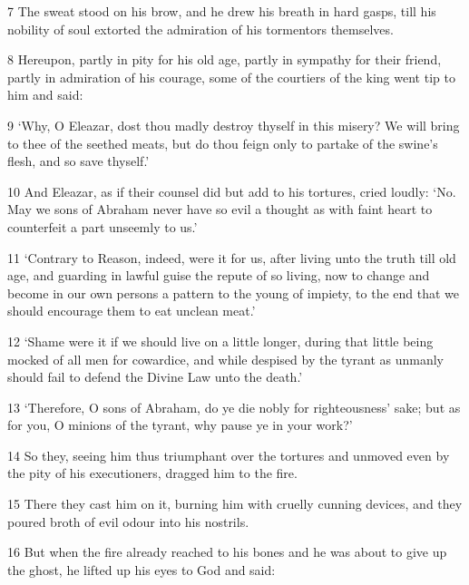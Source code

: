 \par 7 The sweat stood on his brow, and he drew his breath in hard gasps, till his nobility of soul extorted the admiration of his tormentors themselves.

\par 8 Hereupon, partly in pity for his old age, partly in sympathy for their friend, partly in admiration of his courage, some of the courtiers of the king went tip to him and said:

\par 9 ‘Why, O Eleazar, dost thou madly destroy thyself in this misery? We will bring to thee of the seethed meats, but do thou feign only to partake of the swine's flesh, and so save thyself.’

\par 10 And Eleazar, as if their counsel did but add to his tortures, cried loudly: ‘No. May we sons of Abraham never have so evil a thought as with faint heart to counterfeit a part unseemly to us.’

\par 11 ‘Contrary to Reason, indeed, were it for us, after living unto the truth till old age, and guarding in lawful guise the repute of so living, now to change and become in our own persons a pattern to the young of impiety, to the end that we should encourage them to eat unclean meat.’

\par 12 ‘Shame were it if we should live on a little longer, during that little being mocked of all men for cowardice, and while despised by the tyrant as unmanly should fail to defend the Divine Law unto the death.’

\par 13 ‘Therefore, O sons of Abraham, do ye die nobly for righteousness' sake; but as for you, O minions of the tyrant, why pause ye in your work?’

\par 14 So they, seeing him thus triumphant over the tortures and unmoved even by the pity of his executioners, dragged him to the fire.

\par 15 There they cast him on it, burning him with cruelly cunning devices, and they poured broth of evil odour into his nostrils.

\par 16 But when the fire already reached to his bones and he was about to give up the ghost, he lifted up his eyes to God and said:

